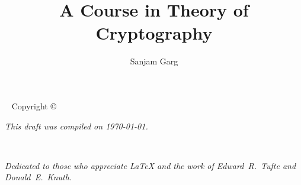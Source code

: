 \documentclass[12pt]{tufte-book}
\title{A Course in Theory of Cryptography}
\author[Sanjam Garg]{Sanjam Garg}
\newcommand{\openepigraph}[2]{%
  \begin{fullwidth}
  \sffamily\large
  \begin{doublespace}
  \noindent\allcaps{#1}\\%
  \noindent\allcaps{#2}%
  \end{doublespace}
  \end{fullwidth}
}
\newcommand{\blankpage}{\newpage\hbox{}\thispagestyle{empty}\newpage}
\begin{document}
\iffalse
\frontmatter

\blankpage


\newpage\thispagestyle{empty}
\openepigraph{%
The public is more familiar with bad design than good design.
It is, in effect, conditioned to prefer bad design, 
because that is what it lives with. 
The new becomes threatening, the old reassuring.
}{Paul Rand%
}
\vfill
\openepigraph{%
A designer knows that he has achieved perfection 
not when there is nothing left to add, 
but when there is nothing left to take away.
}{Antoine de Saint-Exup\'{e}ry}
\vfill
\openepigraph{%
\ldots the designer of a new system must not only be the implementor and the first 
large-scale user; the designer should also write the first user manual\ldots 
If I had not participated fully in all these activities, 
literally hundreds of improvements would never have been made, 
because I would never have thought of them or perceived 
why they were important.
}{Donald E. Knuth}
\fi

\maketitle


\begin{fullwidth}
~\vfill
\thispagestyle{empty}
\setlength{\parindent}{0pt}
\setlength{\parskip}{\baselineskip}
Copyright \copyright\ \the\year\ \thanklessauthor


\par{}


\par \doclicenseThis

\par\textit{This draft was compiled on \today.}
\end{fullwidth}

\tableofcontents



\iffalse
\cleardoublepage
~\vfill

\begin{doublespace}
\noindent\fontsize{18}{22}\selectfont\itshape
\nohyphenation
Dedicated to those who appreciate \LaTeX{} 
and the work of \mbox{Edward R.~Tufte} 
and \mbox{Donald E.~Knuth}.
\end{doublespace}
\vfill
\vfill
\end{document}
